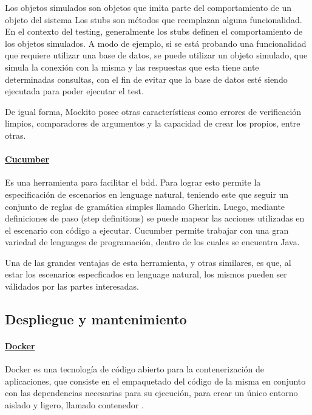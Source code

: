 Los objetos simulados son objetos que imita parte del comportamiento de un objeto del sistema Los stubs son métodos que reemplazan alguna funcionalidad. En el contexto del testing, generalmente los stubs definen el comportamiento de los objetos simulados.
A modo de ejemplo, si se está probando una funcionalidad que requiere utilizar una base de datos, se puede utilizar un objeto simulado, que simula la conexión con la misma y las respuestas que esta tiene ante determinadas consultas, con el fin de evitar que la base de datos esté siendo ejecutada para poder ejecutar el test.

De igual forma, Mockito posee otras características como errores de verificación limpios, comparadores de argumentos y la capacidad de crear los propios, entre otras. 

\paragraph{\href{https://cucumber.io/docs}{Cucumber}}
Es una herramienta para facilitar el \acrshort{bdd}. Para lograr esto permite la especificación de escenarios en lenguage natural, teniendo este que seguir un conjunto de reglas de gramática simples llamado Gherkin. Luego, mediante definiciones de paso (step definitions) se puede mapear las acciones utilizadas en el escenario con código a ejecutar. Cucumber permite trabajar con una gran variedad de lenguages de programación, dentro de los cuales se encuentra Java.

Una de las grandes ventajas de esta herramienta, y otras similares, es que, al estar los escenarios especficados en lenguage natural, los mismos pueden ser válidados por las partes interesadas.

\subsection{Despliegue y mantenimiento}

\paragraph{\href{https://www.docker.com/}{Docker}}
Docker es una tecnología de código abierto para la contenerización de aplicaciones, que consiste en el empaquetado del código de la misma en conjunto con las dependencias necesarias para su ejecución, para crear un único entorno aislado y ligero, llamado contenedor \cite{ibmContainerization}.


